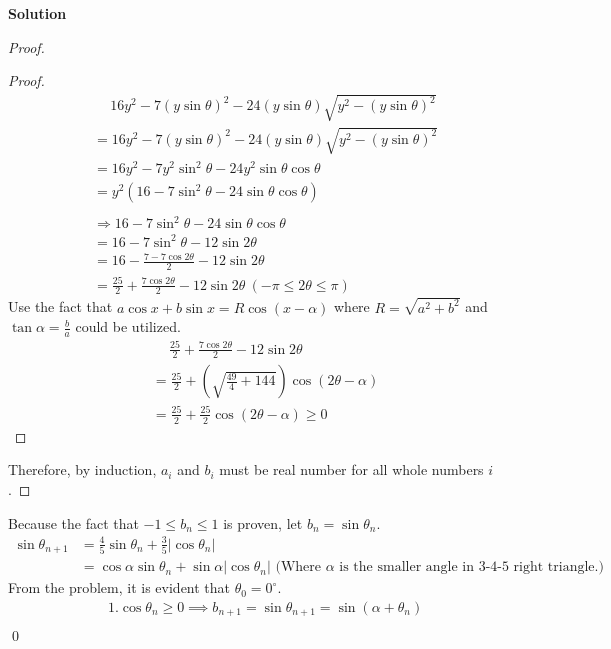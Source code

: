 \documentclass{article}
\newenvironment{solution}{\begin{trivlist}\item[]{\bf Solution}}{\qed \end{trivlist}}
\begin{document}
\begin{solution}
\begin{proof}
\begin{proof}
        \begin{align*}
            &\quad \  16 y^2 - 7 (y \sin\theta)^2 - 24 (y \sin\theta) \sqrt{y^2 - (y \sin\theta)^2} \\
            &=16 y^2 - 7 (y \sin\theta)^2 - 24 (y \sin\theta) \sqrt{y^2 - (y \sin\theta)^2} \\
            &=16 y^2 - 7 y^2 \sin^2\theta - 24 y^2 \sin\theta \cos\theta \\
            &=y^2(16  - 7 \sin^2\theta - 24 \sin\theta \cos\theta)
            \\\\
            &\Rightarrow 16  - 7 \sin^2\theta - 24 \sin\theta \cos\theta \\
            &= 16 - 7 \sin^2\theta - 12 \sin2\theta \\
            &= 16 - \frac{7 - 7\cos2\theta}{2} - 12\sin2\theta \\
            &= \frac{25}{2} + \frac{7\cos2\theta}{2} - 12\sin2\theta \ (-\pi \le 2\theta \le \pi)
        \end{align*}
        Use the fact that $a \cos x + b \sin x = R \cos(x - \alpha)$ where $R = \sqrt{a^2 + b^2}$ and $\tan\alpha = \frac{b}{a}$ could be utilized.
        \begin{align*}
            & \quad \ \frac{25}{2} + \frac{7\cos2\theta}{2} - 12\sin2\theta \\
            &= \frac{25}{2} + \left( \sqrt{\frac{49}{4} + 144} \right) \cos(2\theta - \alpha) \\
            &= \frac{25}{2} + \frac{25}{2} \cos(2\theta - \alpha) \ge 0
        \end{align*}
    \end{proof}
    \noindent
    Therefore, by induction, $a_i$ and $b_i$ must be real number for all whole numbers $i$.
\end{proof}
\noindent
Because the fact that $-1 \le b_n \le 1$ is proven, let $b_n = \sin\theta_n$.
\begin{align*}
    \sin\theta_{n+1}
    &= \frac{4}{5} \sin\theta_n + \frac{3}{5}|\cos\theta_n| \\
    &= \cos\alpha\sin\theta_n + \sin\alpha|\cos\theta_n| \text{ (Where $\alpha$ is the smaller angle in 3-4-5 right triangle.)}
\end{align*}
From the problem, it is evident that $\theta_0 = 0^{\circ}$. 
\begin{align*}
    &1. \cos\theta_n \ge 0 \implies b_{n + 1}=\sin\theta_{n + 1} = \sin(\alpha + \theta_n) \\

\end{align*}
\end{solution}
\end{document}
